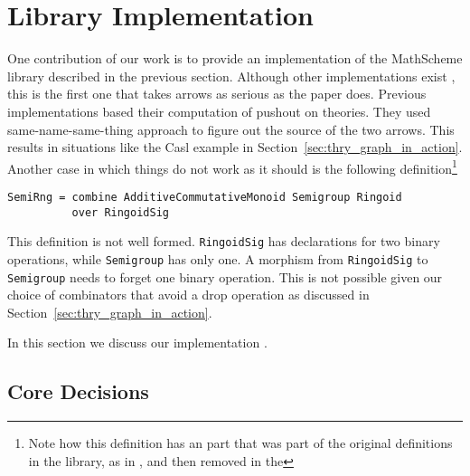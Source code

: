 \section{Library Implementation}
\label{sec:lib_implementation}
One contribution of our work is to provide an implementation of the MathScheme library described in the previous section. Although other implementations exist , this is the first one that takes arrows as serious as the paper does. Previous implementations based their computation of pushout on theories. They used same-name-same-thing approach to figure out the source of the two arrows. This results in situations like the Casl example in Section~\ref{sec:thry_graph_in_action}. Another case in which things do not work as it should is the following definition\footnote{Note how this definition has an  part that was part of the original definitions in the library, as in \cite{CaretteOConnorTPC}, and then removed in the }
\begin{lstlisting}
SemiRng = combine AdditiveCommutativeMonoid Semigroup Ringoid
          over RingoidSig
\end{lstlisting}
This definition is not well formed. \verb|RingoidSig| has declarations for two binary operations, while \verb|Semigroup| has only one. A morphism from \verb|RingoidSig| to \verb|Semigroup| needs to forget one binary operation. This is not possible given our choice of combinators that avoid a drop operation as discussed in Section~\ref{sec:thry_graph_in_action}. 

In this section we discuss our implementation . 

\subsection{Core Decisions}

